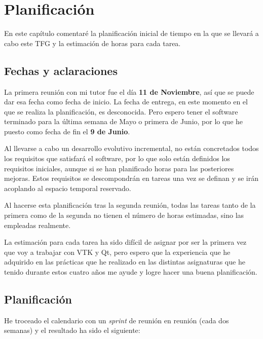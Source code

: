 \chapter{Planificación}

En este capítulo comentaré la planificación inicial de tiempo en la que se llevará a cabo este TFG y la estimación de horas para cada tarea.

\section{Fechas y aclaraciones}

La primera reunión con mi tutor fue el día \textbf{11 de Noviembre}, así que se puede dar esa fecha como fecha de inicio. La fecha de entrega, en este momento en el que se realiza la planificación, es desconocida. Pero espero tener el software terminado para la última semana de Mayo o primera de Junio, por lo que he puesto como fecha de fin el \textbf{9 de Junio}.

Al llevarse a cabo un desarrollo evolutivo incremental, no están concretados todos los requisitos que satisfará el software, por lo que solo están definidos los requisitos iniciales, aunque si se han planificado horas para las posteriores mejoras. Estos requisitos se descompondrán en tareas una vez se definan y se irán acoplando al espacio temporal reservado.

Al hacerse esta planificación tras la segunda reunión, todas las tareas tanto de la primera como de la segunda no tienen el número de horas estimadas, sino las empleadas realmente.

La estimación para cada tarea ha sido difícil de asignar por ser la primera vez que voy a trabajar con VTK y Qt, pero espero que la experiencia que he adquirido en las prácticas que he realizado en las distintas asignaturas que he tenido durante estos cuatro años me ayude y logre hacer una buena planificación.

\section{Planificación}

He troceado el calendario con un \textit{sprint} de reunión en reunión (cada dos semanas) y el resultado ha sido el siguiente:

